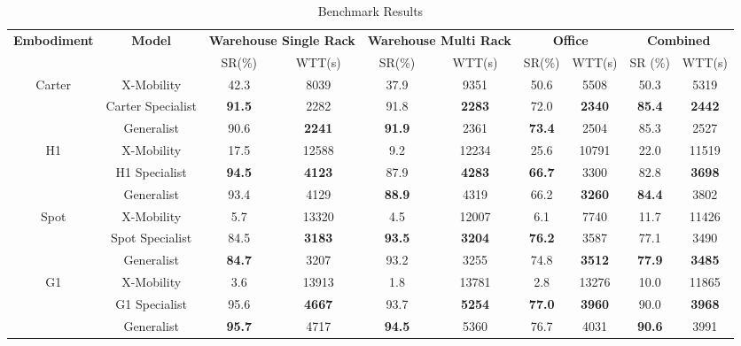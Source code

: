\documentclass[letterpaper, 10 pt,conference]{ieeeconf}
\begin{document}
\begin{table*}[ht]
    \centering
    \small
    \caption{Benchmark Results}
    \begin{tabular}{c|c|cc|cc|cc|cc}
        \toprule
        \textbf{Embodiment} & \textbf{Model} & \multicolumn{2}{c|}{\textbf{Warehouse Single Rack}} & \multicolumn{2}{c|}{\textbf{Warehouse Multi Rack}} & \multicolumn{2}{c|}{\textbf{Office}} & \multicolumn{2}{c}{\textbf{Combined}} \\
        & & SR(\%) & WTT(s) & SR(\%) & WTT(s) & SR(\%) & WTT(s) & SR (\%) & WTT(s) \\
        \midrule
        \multirow{3}{*}{Carter} 
        & X-Mobility & 42.3 & 8039 & 37.9 & 9351 & 50.6 & 5508 & 50.3 & 5319 \\
        & Carter Specialist & \textbf{91.5} & 2282 & 91.8 & \textbf{2283} & 72.0 & \textbf{2340} & \textbf{85.4} & \textbf{2442} \\
        & Generalist & 90.6 & \textbf{2241} & \textbf{91.9} & 2361 & \textbf{73.4} & 2504 & 85.3 & 2527 \\
        \midrule
        \multirow{3}{*}{H1} 
        & X-Mobility & 17.5 & 12588 & 9.2 & 12234 & 25.6 & 10791 & 22.0 & 11519 \\
        & H1 Specialist & \textbf{94.5} & \textbf{4123} & 87.9 & \textbf{4283} & \textbf{66.7} & 3300 & 82.8 & \textbf{3698} \\
        & Generalist & 93.4 & 4129 & \textbf{88.9} & 4319 & 66.2 & \textbf{3260} & \textbf{84.4} & 3802 \\
        \midrule
        \multirow{3}{*}{Spot} 
        & X-Mobility & 5.7 & 13320 & 4.5 & 12007 & 6.1 & 7740 & 11.7 & 11426 \\
        & Spot Specialist & 84.5 & \textbf{3183} & \textbf{93.5} & \textbf{3204} & \textbf{76.2} & 3587 & 77.1 & 3490 \\
        & Generalist & \textbf{84.7} & 3207 & 93.2 & 3255 & 74.8 & \textbf{3512} & \textbf{77.9} & \textbf{3485} \\
        \midrule
        \multirow{3}{*}{G1} 
        & X-Mobility & 3.6 & 13913 & 1.8 & 13781 & 2.8 & 13276 & 10.0 & 11865 \\
        & G1 Specialist & 95.6 & \textbf{4667} & 93.7 & \textbf{5254} & \textbf{77.0} & \textbf{3960} & 90.0 & \textbf{3968} \\
        & Generalist & \textbf{95.7} & 4717 & \textbf{94.5} & 5360 & 76.7 & 4031 & \textbf{90.6} & 3991 \\
        \bottomrule
    \end{tabular}
    \label{tab:benchmark}
\end{table*}
\end{document}
